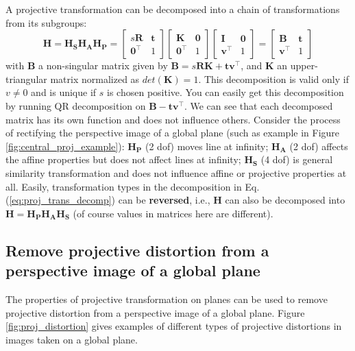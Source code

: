 \documentclass[12pt]{article}
\numberwithin{equation}{section}
\begin{document}
A projective transformation can be decomposed into a chain of transformations from its subgroups:
\begin{equation}
\mathbf{H} = \mathbf{H_SH_AH_P} =
\begin{bmatrix}
s\mathbf{R} & \mathbf{t} \\
\mathbf{0}^\top & 1
\end{bmatrix}
\begin{bmatrix}
\mathbf{K} & \mathbf{0} \\
\mathbf{0}^\top & 1
\end{bmatrix}
\begin{bmatrix}
\mathbf{I} & \mathbf{0} \\
\mathbf{v}^\top & 1
\end{bmatrix}
=
\begin{bmatrix}
\mathbf{B} & \mathbf{t} \\
\mathbf{v}^\top & 1
\end{bmatrix}
\label{eq:proj_trans_decomp}
\end{equation}
with $\mathbf{B}$ a non-singular matrix given by $\mathbf{B}=s\mathbf{RK} + \mathbf{tv}^\top$, and $\mathbf{K}$ an upper-triangular matrix normalized as $det(\mathbf{K}) = 1$. This decomposition is valid only if $v \neq 0$ and is unique if $s$ is chosen positive. You can easily get this decomposition by running QR decomposition on $\mathbf{B - tv^\top}$. We can see that each decomposed matrix has its own function and does not influence others. Consider the process of rectifying the perspective
image of a global plane (such as example in Figure \ref{fig:central_proj_example}): $\mathbf{H_P}$ (2 dof) moves line at infinity; $\mathbf{H_A}$ (2 dof) affects the affine properties but does not affect lines at infinity; $\mathbf{H_S}$ (4 dof) is general similarity transformation and does not influence affine or projective properties at all. Easily, transformation types in the decomposition in Eq. (\ref{eq:proj_trans_decomp}) can be \textbf{reversed}, i.e., $\mathbf{H}$ can also be decomposed into $\mathbf{H = H_PH_AH_S}$ (of course values in matrices here are different).


\subsection{Remove projective distortion from a perspective image of a global plane}
\label{2d_proj_distortion}

The properties of projective transformation on planes can be used to remove projective distortion from a perspective image of a global plane. Figure \ref{fig:proj_distortion} gives examples of different types of projective distortions in images taken on a global plane.
\end{document}
